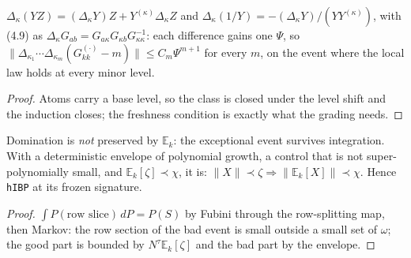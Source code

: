 \begin{theorem}
  $\Delta_\kappa(YZ)=(\Delta_\kappa Y)Z+Y^{(\kappa)}\Delta_\kappa Z$ and
  $\Delta_\kappa(1/Y)=-(\Delta_\kappa Y)/(YY^{(\kappa)})$, with (4.9) as
  $\Delta_\kappa G_{ab}=G_{a\kappa}G_{\kappa b}G_{\kappa\kappa}^{-1}$: each difference gains one
  $\Psi$, so $\|\Delta_{\kappa_1}\cdots\Delta_{\kappa_m}(G^{(\cdot)}_{kk}-m)\|\le C_m\Psi^{m+1}$ for
  every $m$, on the event where the local law holds at every minor level.
\end{theorem}
\begin{proof}\leanok
  Atoms carry a base level, so the class is closed under the level shift and the induction closes;
  the freshness condition is exactly what the grading needs.
\end{proof}

\begin{theorem}\label{thm:conddom}
  \leanok{}
  Domination is \emph{not} preserved by $\mathbb E_k$: the exceptional event survives integration.
  With a deterministic envelope of polynomial growth, a control that is not super-polynomially
  small, and $\mathbb E_k[\zeta]\prec\chi$, it is: $\|X\|\prec\zeta\Rightarrow
  \|\mathbb E_k[X]\|\prec\chi$. Hence \texttt{hIBP} at its frozen signature.
\end{theorem}
\begin{proof}\leanok
  $\int P(\text{row slice})\,dP=P(S)$ by Fubini through the row-splitting map, then Markov: the row
  section of the bad event is small outside a small set of $\omega$; the good part is bounded by
  $N^\tau\mathbb E_k[\zeta]$ and the bad part by the envelope.
\end{proof}

